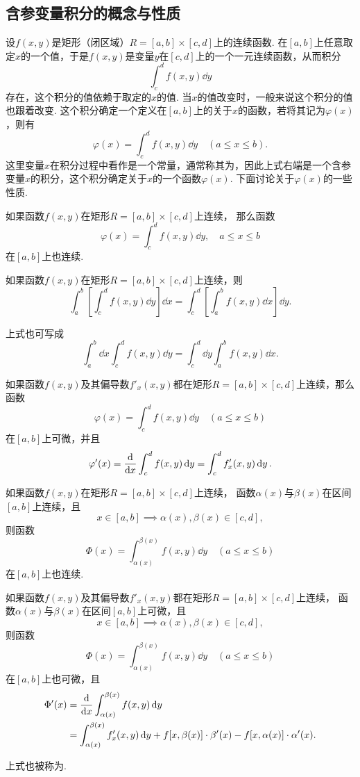 \subsection{含参变量积分的概念与性质}
设\(f(x,y)\)是矩形（闭区域）\(R = [a,b]\times[c,d]\)上的连续函数.
在\([a,b]\)上任意取定\(x\)的一个值，于是\(f(x,y)\)是变量\(y\)在\([c,d]\)上的一个一元连续函数，从而积分\[
\int_c^d f(x,y) \dd{y}
\]存在，这个积分的值依赖于取定的\(x\)的值.
当\(x\)的值改变时，一般来说这个积分的值也跟着改变.
这个积分确定一个定义在\([a,b]\)上的关于\(x\)的函数，若将其记为\(\varphi(x)\)，则有\[
\varphi(x) = \int_c^d f(x,y) \dd{y}
\quad(a \leqslant x \leqslant b).
\]这里变量\(x\)在积分过程中看作是一个常量，通常称其为，因此上式右端是一个含参变量\(x\)的积分，这个积分确定关于\(x\)的一个函数\(\varphi(x)\).
下面讨论关于\(\varphi(x)\)的一些性质.

\begin{theorem}
如果函数\(f(x,y)\)在矩形\(R=[a,b]\times[c,d]\)上连续，%
那么函数\[
\varphi(x) = \int_c^d{f(x,y)\dd{y}}, \quad a \leqslant x \leqslant b
\]在\([a,b]\)上也连续.
\end{theorem}

\begin{theorem}
如果函数\(f(x,y)\)在矩形\(R=[a,b]\times[c,d]\)上连续，则\[
\int_a^b\left[\int_c^d f(x,y) \dd{y}\right] \dd{x}
=\int_c^d\left[\int_a^b f(x,y) \dd{x}\right] \dd{y}.
\]
\end{theorem}
上式也可写成\[
\int_a^b \dd{x} \int_c^d f(x,y) \dd{y}
=\int_c^d \dd{y} \int_a^b f(x,y) \dd{x}.
\]

\begin{theorem}
如果函数\(f(x,y)\)及其偏导数\(f'_x(x,y)\)都在矩形\(R=[a,b]\times[c,d]\)上连续，那么函数\[
\varphi(x) = \int_c^d f(x,y) \dd{y}
\quad(a \leqslant x \leqslant b)
\]在\([a,b]\)上可微，并且\[
\varphi'(x) = \dv{x} \int_c^d f(x,y) \dd{y}
= \int_c^d f'_x(x,y) \dd{y}.
\]
\end{theorem}

\begin{theorem}
如果函数\(f(x,y)\)在矩形\(R=[a,b]\times[c,d]\)上连续，%
函数\(\alpha(x)\)与\(\beta(x)\)在区间\([a,b]\)上连续，且\[
x \in [a,b] \implies \alpha(x),\beta(x) \in [c,d],
\]则函数\[
\Phi(x) = \int_{\alpha(x)}^{\beta(x)} f(x,y)\dd{y}
\quad(a \leqslant x \leqslant b)
\]在\([a,b]\)上也连续.
\end{theorem}

\begin{theorem}
如果函数\(f(x,y)\)及其偏导数\(f'_x(x,y)\)都在矩形\(R=[a,b]\times[c,d]\)上连续，%
函数\(\alpha(x)\)与\(\beta(x)\)在区间\([a,b]\)上可微，且\[
x \in [a,b] \implies \alpha(x),\beta(x) \in [c,d],
\]则函数\[
\Phi(x) = \int_{\alpha(x)}^{\beta(x)} f(x,y)\dd{y}
\quad(a \leqslant x \leqslant b)
\]在\([a,b]\)上也可微，且\begin{align*}
\Phi'(x) &= \dv{x} \int_{\alpha(x)}^{\beta(x)} f(x,y) \dd{y} \\
&= \int_{\alpha(x)}^{\beta(x)} f'_x(x,y) \dd{y}
	+ f[x,\beta(x)] \cdot \beta'(x)
	- f[x,\alpha(x)] \cdot \alpha'(x).
\end{align*}
\end{theorem}
上式也被称为.

